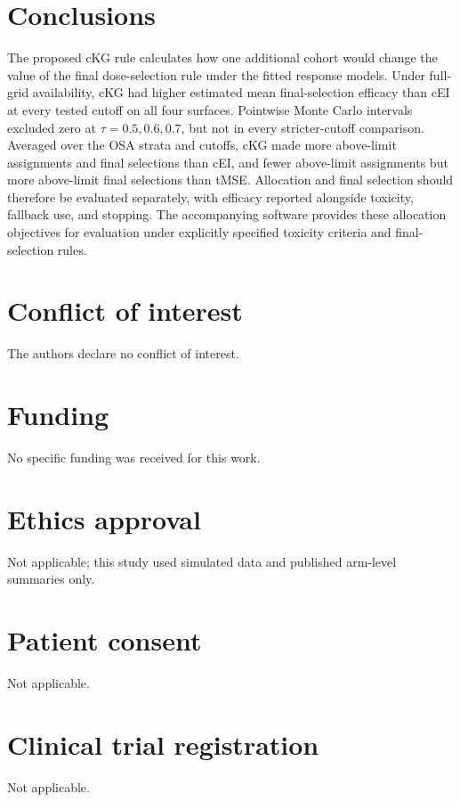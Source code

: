 \documentclass[11pt]{article}
\newcommand{\rev}[1]{{#1}}
\begin{document}
\section{Conclusions}

The proposed cKG rule calculates how one additional cohort would change the value of the final dose-selection rule under the fitted response models. \rev{Under full-grid availability, cKG had higher estimated mean final-selection efficacy than cEI at every tested cutoff on all four surfaces. Pointwise Monte Carlo intervals excluded zero at $\tau=0.5,0.6,0.7$, but not in every stricter-cutoff comparison. Averaged over the OSA strata and cutoffs, cKG made more above-limit assignments and final selections than cEI, and fewer above-limit assignments but more above-limit final selections than tMSE.} \rev{Allocation and final selection should therefore be evaluated separately, with efficacy reported alongside toxicity, fallback use, and stopping.} \rev{The accompanying software provides these allocation objectives for evaluation under explicitly specified toxicity criteria and final-selection rules.}

\section*{Conflict of interest}
The authors declare no conflict of interest.

\section*{Funding}
No specific funding was received for this work.

\section*{Ethics approval}
Not applicable; this study used simulated data and published arm-level summaries only.

\section*{Patient consent}
Not applicable.

\section*{Clinical trial registration}
Not applicable.
\end{document}
